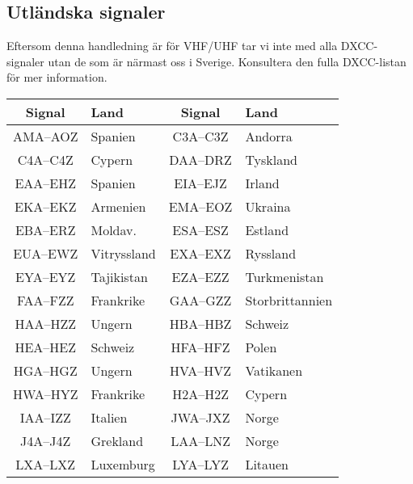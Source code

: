\subsection{Utländska signaler}

Eftersom denna handledning är för VHF/UHF tar vi inte med alla DXCC-signaler utan de som är närmast oss i Sverige. Konsultera den fulla DXCC-listan för mer information.

\begin{center}
\begin{longtable}{cl|cl}
	   \textbf{Signal} & \textbf{Land}        & \textbf{Signal} & \textbf{Land}         \\ \hline
	\endhead
              AMA--AOZ     & Spanien              & C3A--C3Z        & Andorra               \\
	      C4A--C4Z     & Cypern               & DAA--DRZ        & Tyskland              \\
	      EAA--EHZ     & Spanien              & EIA--EJZ        & Irland                \\
	      EKA--EKZ     & Armenien             & EMA--EOZ        & Ukraina               \\
	      EBA--ERZ     & Moldav.              & ESA--ESZ        & Estland               \\
	      EUA--EWZ     & Vitryssland          & EXA--EXZ        & Ryssland              \\
	      EYA--EYZ     & Tajikistan           & EZA--EZZ        & Turkmenistan          \\
	      FAA--FZZ     & Frankrike            & GAA--GZZ        & Storbrittannien       \\
	      HAA--HZZ     & Ungern               & HBA--HBZ        & Schweiz               \\
	      HEA--HEZ     & Schweiz              & HFA--HFZ        & Polen                 \\
	      HGA--HGZ     & Ungern               & HVA--HVZ        & Vatikanen             \\
	      HWA--HYZ     & Frankrike            & H2A--H2Z        & Cypern                \\
	      IAA--IZZ     & Italien              & JWA--JXZ        & Norge                 \\
	      J4A--J4Z     & Grekland             & LAA--LNZ        & Norge                 \\
	      LXA--LXZ     & Luxemburg            & LYA--LYZ        & Litauen               \\

\end{longtable}
\end{center}
